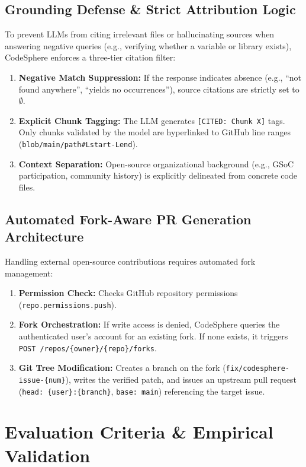 \documentclass[11pt,a4paper]{article}
\begin{document}
\subsection{Grounding Defense \& Strict Attribution Logic}
To prevent LLMs from citing irrelevant files or hallucinating sources when answering negative queries (e.g., verifying whether a variable or library exists), CodeSphere enforces a three-tier citation filter:
\begin{enumerate}
    \item \textbf{Negative Match Suppression:} If the response indicates absence (e.g., ``not found anywhere'', ``yields no occurrences''), source citations are strictly set to $\emptyset$.
    \item \textbf{Explicit Chunk Tagging:} The LLM generates \texttt{[CITED: Chunk X]} tags. Only chunks validated by the model are hyperlinked to GitHub line ranges (\texttt{blob/main/path\#Lstart-Lend}).
    \item \textbf{Context Separation:} Open-source organizational background (e.g., GSoC participation, community history) is explicitly delineated from concrete code files.
\end{enumerate}

\subsection{Automated Fork-Aware PR Generation Architecture}
Handling external open-source contributions requires automated fork management:
\begin{enumerate}
    \item \textbf{Permission Check:} Checks GitHub repository permissions (\texttt{repo.permissions.push}).
    \item \textbf{Fork Orchestration:} If write access is denied, CodeSphere queries the authenticated user's account for an existing fork. If none exists, it triggers \texttt{POST /repos/\{owner\}/\{repo\}/forks}.
    \item \textbf{Git Tree Modification:} Creates a branch on the fork (\texttt{fix/codesphere-issue-\{num\}}), writes the verified patch, and issues an upstream pull request (\texttt{head: \{user\}:\{branch\}}, \texttt{base: main}) referencing the target issue.
\end{enumerate}

\section{Evaluation Criteria \& Empirical Validation}
\end{document}
